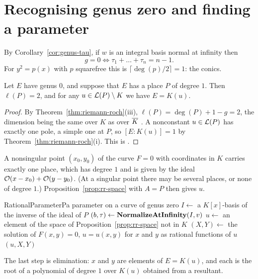 \section{Recognising genus zero and finding a parameter}\label{sec:g0-parameter}

By Corollary~\ref{cor:genus-tau}, if $w$ is an integral basis normal at
infinity then
\[
  g = 0 \iff \tau_1 + \dots + \tau_n = n - 1 .
\]
For $y^2 = p(x)$ with $p$ squarefree this is $\lceil \deg(p)/2 \rceil = 1$:
the conics.

\begin{theorem}\label{thm:g0-parameter}
Let $E$ have genus $0$, and suppose that $E$ has a place $P$ of degree $1$.
Then $\ell(P) = 2$, and for any $u \in \mathcal{L}(P) \setminus K$ we have $E =
K(u)$.
\end{theorem}

\begin{proof}
By Theorem~\ref{thm:riemann-roch}(iii), $\ell(P) = \deg(P) + 1 - g = 2$, the
dimension being the same over $K$ as over $\overline{K}$
\cite[Theorem~3.6.3(d)]{stichtenoth2009}. A nonconstant $u \in \mathcal{L}(P)$ has
exactly one pole, a simple one at $P$, so $[E : K(u)] = 1$ by
Theorem~\ref{thm:riemann-roch}(i). This is
\cite[Proposition~1.6.3]{stichtenoth2009}.
\end{proof}

A nonsingular point $(x_0, y_0)$ of the curve $F = 0$ with coordinates in
$K$ carries exactly one place, which has degree $1$ and is given by the ideal
$\mathcal{O} (x - x_0) + \mathcal{O} (y - y_0)$. (At a singular point there may be several
places, or none of degree $1$.)
Proposition~\ref{prop:rr-space} with $A = P$ then gives $u$.

\begin{algo}{RationalParameter}{P}{a parameter on a curve of genus zero}
\State $I \gets$ a $K[x]$-basis of the inverse of the ideal of $P$ 
\State $(b, \tau) \gets \textbf{NormalizeAtInfinity}(I, v)$ 
\State $u \gets$ an element of the space of Proposition~\ref{prop:rr-space} not in $K$
\State $(X, Y) \gets$ the solution of $F(x, y) = 0$, $u = u(x, y)$ for $x$ and $y$ as rational functions of $u$
\State \Return $(u, X, Y)$
\end{algo}

The last step is elimination: $x$ and $y$ are elements of $E = K(u)$, and
each is the root of a polynomial of degree $1$ over $K(u)$ obtained from a
resultant.

